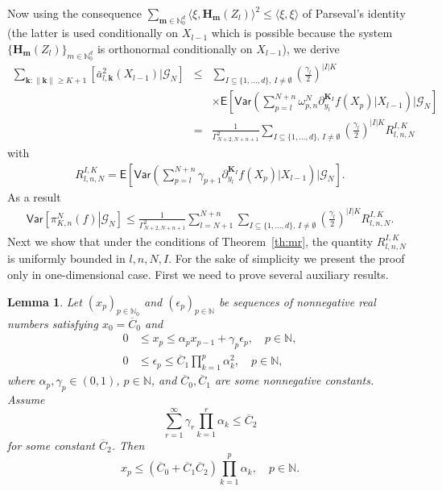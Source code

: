 \documentclass[preprint]{imsart}
\newtheorem{lem}[thm]{Lemma}
\newcommand*{\ol}{\overline}
\begin{document}
Now using the consequence
$\sum_{\mathbf{m}\in \mathbb{N}^d_0} \langle\xi,\mathbf{H}_\mathbf{m}(Z_l)\rangle^2\le\langle\xi,\xi\rangle$
of Parseval's identity
(the latter is used conditionally on $X_{l-1}$
which is possible because the system
$\{\mathbf{H}_\mathbf{m}(Z_l)\}_{m\in \mathbb{N}^d_0}$
is orthonormal conditionally on $X_{l-1}$),
we derive
\begin{eqnarray*}
\sum_{\mathbf{k}\colon\|\mathbf{k}\|\geq K+1}\left[\bar{a}_{l,\mathbf{k}}^{2}(X_{l-1})|\mathcal{G}_{N}\right]
&\leq & \sum_{I\subseteq\{1,\ldots,d\},\, I\neq \emptyset}
\left(\frac{\gamma_{l}}{2}\right)^{|I|K}
\\
&& \times\mathsf E\left[
\mathsf{Var}\left(\sum_{p=l}^{N+n}\omega_{p,n}^{N}\partial_{y_{l}}^{\mathbf{K}_I}f\left(X_{p}\right)
\Big|X_{l-1}\right)
\Bigg|\mathcal G_N\right]
\\
&=& \frac{1}{\Gamma^2_{N+2,N+n+1}}\sum_{I\subseteq\{1,\ldots,d\},\, I\neq \emptyset}
\left(\frac{\gamma_{l}}{2}\right)^{|I|K}
R_{l,n,N}^{I,K}
\end{eqnarray*}
with
\begin{eqnarray*}
R_{l,n,N}^{I,K}=\mathsf E\left[
\mathsf{Var}\left(\sum_{p=l}^{N+n}\gamma_{p+1}\partial_{y_{l}}^{\mathbf{K}_I}f\left(X_{p}\right)
\Big|X_{l-1}\right)
\Bigg|\mathcal G_N\right].
\end{eqnarray*}
As a result
\begin{eqnarray*}
\mathsf{Var}\left[\left.\pi_{K,n}^{N}(f)\right|\mathcal G_N\right]\leq \frac{1}{\Gamma^2_{N+2,N+n+1}}\sum_{l=N+1}^{N+n}\sum_{I\subseteq\{1,\ldots,d\},\, I\neq \emptyset}
\left(\frac{\gamma_{l}}{2}\right)^{|I|K}
R_{l,n,N}^{I,K}.
\end{eqnarray*}
Next we show that under the conditions  of Theorem~\ref{th:mr}, the quantity \(R_{l,n,N}^{I,K}\) is uniformly bounded in \(l,n,N,I.\) For the sake of simplicity we present the proof only in one-dimensional case. First we need to prove several auxiliary results.
\begin{lem}\label{lem:06062018a1}
Let $(x_p)_{p\in\mathbb N_0}$
and $(\epsilon_p)_{p\in\mathbb N}$
be sequences of nonnegative real numbers
satisfying $x_0=\ol C_0$ and
\begin{align}
0&\le x_p\le\alpha_p x_{p-1}+\gamma_p \epsilon_p,\quad p\in\mathbb N,
\label{eq:06062018a1}\\
0&\le\epsilon_p\le\ol C_1\prod_{k=1}^p \alpha_k^2,\quad p\in\mathbb N,
\label{eq:06062018a2}
\end{align}
where $\alpha_p,\gamma_p\in(0,1)$, $p\in\mathbb N$,
and $\ol C_0,\ol C_1$ are some nonnegative constants. Assume
\begin{equation}\label{eq:06062018a3}
\sum_{r=1}^\infty\gamma_r \prod_{k=1}^r \alpha_k\le\ol C_2
\end{equation}
for some constant $\ol C_2$. Then
$$
x_p\le(\ol C_0+\ol C_1\ol C_2)\prod_{k=1}^p \alpha_k,\quad p\in\mathbb N.
$$
\end{lem}
\end{document}
